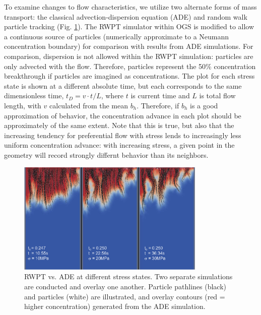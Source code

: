 To examine changes to flow characteristics, we utilize two alternate forms of mass transport: the classical advection-dispersion equation (ADE) and random walk particle tracking (Fig. \ref{fig:stress_rwpt}). The RWPT simulator within OGS is modified to allow a continuous source of particles (numerically approximate to a Neumann concentration boundary) for comparison with results from ADE simulations. For comparison, dispersion is not allowed within the RWPT simulation: particles are only advected with the flow. Therefore, particles represent the 50\% concentration breakthrough if particles are imagined as concentrations. The plot for each stress state is shown at a different absolute time, but each corresponds to the same dimensionless time, ${{t}_{D}}=v\cdot t/L$, where $t$ is current time and $L$ is total flow length, with $v$ calculated from the mean ${{b}_{h}}$. Therefore, if ${{b}_{h}}$ is a good approximation of behavior, the concentration advance in each plot should be approximately of the same extent. Note that this is true, but also that the increasing tendency for preferential flow with stress lends to increasingly less uniform concentration advance: with increasing stress, a given point in the geometry will record strongly differnt behavior than its neighbors.

\begin{figure}[htb]
\centering
\vspace{5mm}
\includegraphics[width=0.8\textwidth]{PART_II/C/rwptfrac.eps}
\caption{RWPT vs. ADE at different stress states. Two separate simulations are conducted and overlay one another. Particle pathlines (black) and particles (white) are illustrated, and overlay contours (red = higher concentration) generated from the ADE simulation.}
\label{fig:stress_rwpt}
\vspace{5mm}
\end{figure}